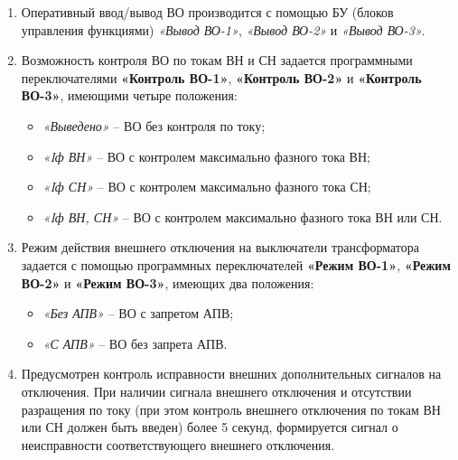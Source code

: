 \begin{enumerate}
\item
Оперативный ввод/вывод ВО производится с помощью БУ (блоков управления функциями) \textit{«Вывод ВО-1»}, \textit{«Вывод ВО-2»} и \textit{«Вывод ВО-3»}.

\item
Возможность контроля ВО по токам ВН и СН задается программными переключателями \textbf{«Контроль ВО-1»}, \textbf{«Контроль ВО-2»} и \textbf{«Контроль ВО-3»}, имеющими четыре положения:
\begin{itemize}
\item \textit{«Выведено»} -- ВО без контроля по току;
\item \textit{«Iф ВН»} -- ВО с контролем максимально фазного тока ВН;
\item \textit{«Iф СН»} -- ВО с контролем максимально фазного тока СН;
\item \textit{«Iф ВН, СН»} -- ВО с контролем максимально фазного тока ВН или СН.
\end{itemize}

\item
Режим действия внешнего отключения на выключатели трансформатора задается с помощью программных переключателей \textbf{«Режим ВО-1»}, \textbf{«Режим ВО-2»} и \textbf{«Режим ВО-3»}, имеющих два положения:
\begin{itemize}
\item \textit{«Без АПВ»} – ВО с запретом АПВ;
\item \textit{«С АПВ»} – ВО без запрета АПВ.
\end{itemize}

\item
Предусмотрен контроль исправности внешних дополнительных сигналов на отключения. При наличии сигнала внешнего отключения и отсутствии разращения по току (при этом контроль внешнего отключения по токам ВН или СН должен быть введен) более 5 секунд, формируется сигнал о неисправности соответствующего внешнего отключения.

\end{enumerate} 